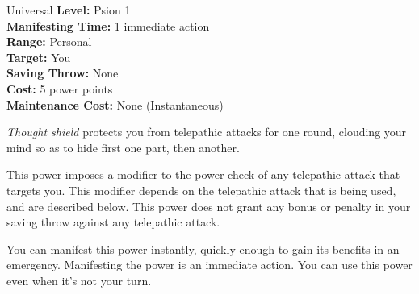 {Universal}
{
	\textbf{Level:}
	Psion 1\\
	\textbf{Manifesting Time:}
	1 immediate action\\
	\textbf{Range:}
	Personal\\
	\textbf{Target:}
	You\\
	\textbf{Saving Throw:}
	None\\
	\textbf{Cost:}
	5 power points\\
	\textbf{Maintenance Cost:}
	None (Instantaneous)\\
}
{
	\emph{Thought shield} protects you from telepathic attacks for one round, clouding your mind so as to hide first one part, then another.

	This power imposes a modifier to the power check of any telepathic attack that targets you. This modifier depends on the telepathic attack that is being used, and are described below. This power does not grant any bonus or penalty in your saving throw against any telepathic attack.


	You can manifest this power instantly, quickly enough to gain its benefits in an emergency. Manifesting the power is an immediate action. You can use this power even when it's not your turn.
}